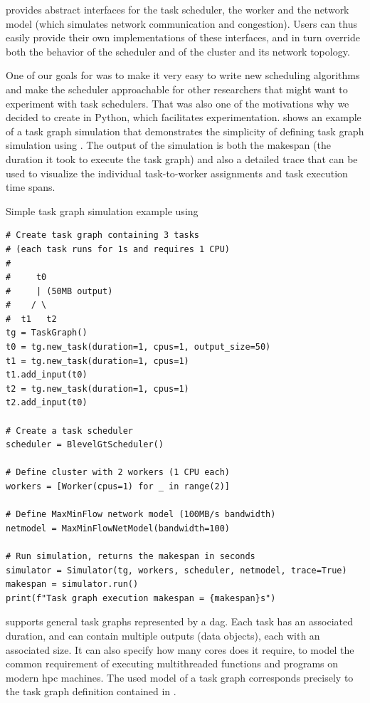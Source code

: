 \estee{} provides abstract interfaces for the task scheduler, the worker and the
network model (which simulates network communication and congestion). Users can thus easily provide
their own implementations of these interfaces, and in turn override both the behavior of the
scheduler and of the cluster and its network topology.

One of our goals for \estee{} was to make it very easy to write new scheduling
algorithms and make the scheduler approachable for other researchers that might want to experiment
with task schedulers. That was also one of the motivations why we decided to create
\estee{} in Python, which facilitates experimentation.  shows
an example of a task graph simulation that demonstrates the simplicity of defining task graph
simulation using \estee{}. The output of the simulation is both the makespan (the
duration it took to execute the task graph) and also a detailed trace that can be used to visualize
the individual task-to-worker assignments and task execution time spans.

\begin{listing}
	\caption{Simple task graph simulation example using \estee{}}
	\label{lst:estee-example}
	\begin{verbatim}
# Create task graph containing 3 tasks
# (each task runs for 1s and requires 1 CPU)
#
#     t0
#     | (50MB output)
#    / \
#  t1   t2
tg = TaskGraph()
t0 = tg.new_task(duration=1, cpus=1, output_size=50)
t1 = tg.new_task(duration=1, cpus=1)
t1.add_input(t0)
t2 = tg.new_task(duration=1, cpus=1)
t2.add_input(t0)

# Create a task scheduler
scheduler = BlevelGtScheduler()

# Define cluster with 2 workers (1 CPU each)
workers = [Worker(cpus=1) for _ in range(2)]

# Define MaxMinFlow network model (100MB/s bandwidth)
netmodel = MaxMinFlowNetModel(bandwidth=100)

# Run simulation, returns the makespan in seconds
simulator = Simulator(tg, workers, scheduler, netmodel, trace=True)
makespan = simulator.run()
print(f"Task graph execution makespan = {makespan}s")
\end{verbatim}
\end{listing}

\estee{} supports general task graphs represented by a \gls{dag}.
Each task has an associated duration, and can contain multiple outputs (data objects), each with an
associated size. It can also specify how many cores does it require, to model the common
requirement of executing multithreaded functions and programs on modern \gls{hpc}
machines. The used model of a task graph corresponds precisely to the task graph definition
contained in \Autoref{ch:taskgraphs}.


